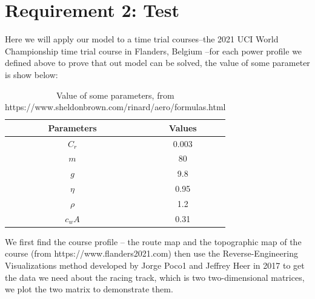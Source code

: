\documentclass[12pt]{article}
\begin{document}
\section{Requirement 2: Test}
Here we will apply our model to a time trial courses--the 2021 UCI World Championship time trial course in Flanders, Belgium --for each power profile we defined
above to prove that out model can be solved, the value of some parameter is show below:
\begin{table}[H]
    \centering
    \begin{tabular}{cc}
        \toprule
        \bf Parameters & \bf Values \\
        \midrule
        $C_r$          & 0.003      \\
        $m$            & 80         \\
        $g$            & 9.8        \\
        $\eta $        & 0.95       \\
        $\rho  $       & 1.2        \\
        $c_wA$         & 0.31       \\
        \bottomrule
    \end{tabular}
    \caption{Value of some parameters, from https://www.sheldonbrown.com/rinard/aero/formulas.html}
\end{table}
We first find the course profile -- the route map and the topographic map of the course (from https://www.flanders2021.com)
then use the Reverse-Engineering Visualizations method developed by Jorge Poco1 and Jeffrey Heer in 2017\cite{poco2017reverse} to get the data we need about the racing track,
which is two two-dimensional matrices, we plot the two matrix to demonstrate them.
\end{document}
